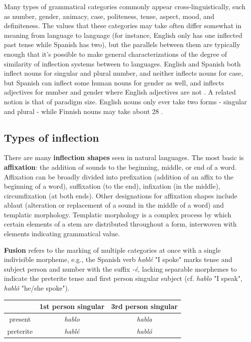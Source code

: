 Many types of grammatical categories commonly appear cross-linguistically, such as number, gender, animacy, case, politeness, tense, aspect, mood, and definiteness. The values that these categories may take often differ somewhat in meaning from language to language (for instance, English only has one inflected past tense while Spanish has two), but the parallels between them are typically enough that it's possible to make general characterizations of the degree of similarity of inflection systems between to languages. English and Spanish both inflect nouns for singular and plural number, and neither inflects nouns for case, but Spanish can inflect some human nouns for gender as well, and inflects adjectives for number and gender where English adjectives are not \parencite{Hogan2010}. A related notion is that of paradigm size. English nouns only ever take two forms - singular and plural - while Finnish nouns may take about 28 \parencite{Wiktionary}.

\subsection{Types of inflection}

There are many \textbf{inflection shapes} seen in natural languages. The most basic is \textbf{affixation}: the addition of sounds to the beginning, middle, or end of a word. Affixation can be broadly divided into prefixation (addition of an affix to the beginning of a word), suffixation (to the end), infixation (in the middle), circumfixation (at both ends). Other designations for affixation shapes include ablaut (alteration or replacement of a sound in the middle of a word) and templatic morphology. Templatic morphology is a complex process by which certain elements of a stem are distributed throughout a form, interwoven with elements indicating grammatical value. 

\textbf{Fusion} refers to the marking of multiple categories at once with a single indivisible morpheme, e.g., the Spanish verb \textit{hablé} "I spoke" marks tense and subject person and number with the suffix \textit{-é}, lacking separable morphemes to indicate the preterite tense and first person singular subject (cf. \textit{hablo} "I speak", \textit{habló} "he/she spoke"). 

\begin{center}
\begin{tabular}{|c||c|c|}
\hline
& 1st person singular & 3rd person singular \\
\hline \hline
present & \textit{hablo} & \textit{habla} \\
\hline 
preterite & \textit{hablé} & \textit{habló} \\
\hline
\end{tabular}
\end{center}

